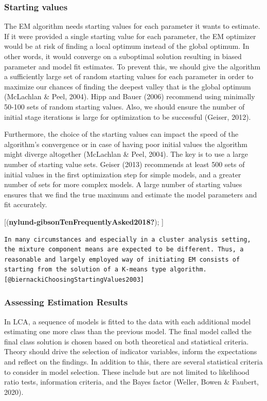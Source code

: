 \documentclass[
  ,man]{apa6}
\begin{document}
\hypertarget{starting-values}{%
\subsubsection{Starting values}\label{starting-values}}

The EM algorithm needs starting values for each parameter it wants to estimate.
If it were provided a single starting value for each parameter,
the EM optimizer would be at risk of finding a local optimum instead of the global optimum.
In other words, it would converge on a suboptimal solution resulting in biased parameter and model fit estimates.
To prevent this, we should give the algorithm a sufficiently large set of random starting values for each parameter
in order to maximize our chances of finding the deepest valley that is the global optimum (McLachlan \& Peel, 2004).
Hipp and Bauer (2006) recommend using minimally 50-100 sets of random starting values.
Also, we should ensure the number of initial stage iterations is large for optimization to be successful (Geiser, 2012).

Furthermore, the choice of the starting values can impact the speed of the algorithm's convergence
or in case of having poor initial values the algorithm might diverge altogether (McLachlan \& Peel, 2004).
The key is to use a large number of starting value sets.
Geiser (2013) recommends at least 500 sets of initial values in the first optimization step for simple models,
and a greater number of sets for more complex models.
A large number of starting values ensures that we find the true maximum and estimate the model parameters and fit accurately.

{[}(\textbf{nylund-gibsonTenFrequentlyAsked2018?}); {]}

\begin{verbatim}
In many circumstances and especially in a cluster analysis setting, the mixture component means are expected to be different. Thus, a reasonable and largely employed way of initiating EM consists of starting from the solution of a K-means type algorithm. [@biernackiChoosingStartingValues2003]
\end{verbatim}

\hypertarget{assessing-estimation-results}{%
\subsubsection{Assessing Estimation Results}\label{assessing-estimation-results}}

In LCA, a sequence of models is fitted to the data
with each additional model estimating one more class than the previous model.
The final model called the final class solution is chosen based on both theoretical and statistical criteria.
Theory should drive the selection of indicator variables, inform the expectations and reflect on the findings.
In addition to this, there are several statistical criteria to consider in model selection.
These include but are not limited to likelihood ratio tests, information criteria,
and the Bayes factor (Weller, Bowen \& Faubert, 2020).
\end{document}
